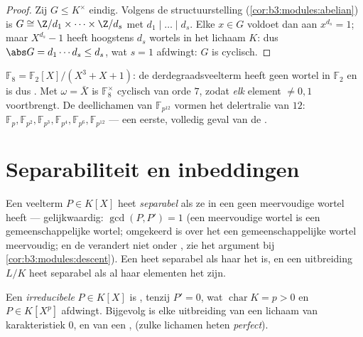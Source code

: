 \begin{proof}
Zij $G \leq K^\times$ eindig. Volgens de structuurstelling
(\cref{cor:b3:modules:abelian}) is $G \cong \Z/d_1 \times \dots
\times \Z/d_s$ met $d_1 \mid \dots \mid d_s$. Elke $x \in G$
voldoet dan aan $x^{d_s} = 1$; maar $X^{d_s} - 1$ heeft hoogstens
$d_s$ wortels in het lichaam $K$: dus $\abs G = d_1\cdots d_s \leq
d_s$, wat $s = 1$ afdwingt: $G$ is cyclisch.
\end{proof}

\begin{example}\label{ex:b3:galois:f8}
$\mathbb F_8 = \mathbb F_2[X]/(X^3 + X + 1)$: de derdegraadsveelterm
heeft geen wortel in $\mathbb F_2$ en is dus . Met
$\omega = \bar X$ is $\mathbb F_8^\times$ cyclisch van orde $7$,
zodat \emph{elk} element $\neq 0, 1$ voortbrengt. De deellichamen
van $\mathbb F_{p^{12}}$ vormen het delertralie van $12$: $\mathbb
F_p, \mathbb F_{p^2}, \mathbb F_{p^3}, \mathbb F_{p^4}, \mathbb
F_{p^6}, \mathbb F_{p^{12}}$ --- een eerste, volledig geval van de
.
\end{example}

\section{Separabiliteit en inbeddingen}

\begin{definition}\label{def:b3:galois:separable}
Een veelterm $P \in K[X]$ heet \emph{separabel} als ze in een  geen meervoudige wortel
heeft --- gelijkwaardig: $\gcd(P, P') = 1$ (een meervoudige wortel
is een gemeenschappelijke wortel; omgekeerd is over het
 een gemeenschappelijke wortel meervoudig; en de
 verandert niet onder ,
zie het argument bij \cref{cor:b3:modules:descent}). Een
 heet separabel als haar  het
is, en een uitbreiding $L/K$ heet separabel als al haar elementen
het zijn.
\end{definition}

\begin{proposition}\label{prop:b3:galois:perfect}
Een \emph{irreducibele} $P \in K[X]$ is , tenzij $P' =
0$, wat $\operatorname{char} K = p > 0$ en $P \in K[X^p]$
afdwingt. Bijgevolg is elke  uitbreiding van een
lichaam van karakteristiek $0$, en van een ,
 (zulke lichamen heten \emph{perfect}).
\end{proposition}

